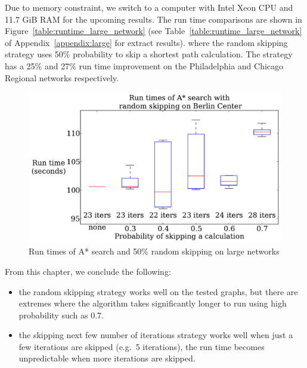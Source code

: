 Due to memory constraint, we switch to a computer with Intel Xeon CPU and 11.7 GiB RAM for the upcoming results.
The run time comparisons are shown in Figure~\ref{table:runtime_large_network} (see Table~\ref{table:runtime_large_network} of Appendix~\ref{appendix:large} for extract results).
where the random skipping strategy uses 50\% probability to skip a shortest path calculation.
The strategy has a 25\% and 27\% run time improvement on the Philadelphia and Chicago Regional networks respectively.

\begin{figure}[!hb]
    \centering
    \includegraphics[page=5,width=\textwidth]{img/random_time}
    \caption{Run times of A* search and 50\% random skipping on large networks}
    \label{fig:large_random_n}
\end{figure}

From this chapter, we conclude the following:
\begin{itemize}
    \item the random skipping strategy works well on the tested graphs,
but there are extremes where the algorithm takes significantly longer to run using high probability such as 0.7.
    \item the skipping next few number of iterations strategy works well when just a few iterations are skipped (e.g.\ 5 iterations), the run time becomes unpredictable when more iterations are skipped.
\end{itemize}
